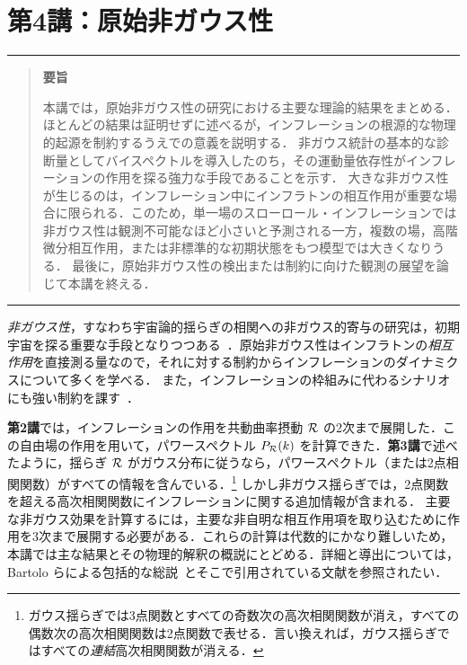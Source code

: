 \part{第4講：原始非ガウス性}

\vspace{0.5cm}
 \hrule \vspace{0.3cm}
\begin{quote}
{\bf 要旨}

\noindent
本講では，原始非ガウス性の研究における主要な理論的結果をまとめる．
ほとんどの結果は証明せずに述べるが，インフレーションの根源的な物理的起源を制約するうえでの意義を説明する．
非ガウス統計の基本的な診断量としてバイスペクトルを導入したのち，その運動量依存性がインフレーションの作用を探る強力な手段であることを示す．
大きな非ガウス性が生じるのは，インフレーション中にインフラトンの相互作用が重要な場合に限られる．このため，単一場のスローロール・インフレーションでは非ガウス性は観測不可能なほど小さいと予測される一方，複数の場，高階微分相互作用，または非標準的な初期状態をもつ模型では大きくなりうる．
最後に，原始非ガウス性の検出または制約に向けた観測の展望を論じて本講を終える．

\end{quote}
\vspace{0.1cm}  \hrule
 \vspace{0.5cm}



{\it 非ガウス性}，すなわち宇宙論的揺らぎの相関への非ガウス的寄与の研究は，初期宇宙を探る重要な手段となりつつある~\cite{Komatsu:2009kd}．原始非ガウス性はインフラトンの{\it 相互作用}を直接測る量なので，それに対する制約からインフレーションのダイナミクスについて多くを学べる．
また，インフレーションの枠組みに代わるシナリオにも強い制約を課す~\cite{Creminelli:2007aq,Koyama_etal07,Buchbinder_etal07, Lehners:2007wc,Lehners:2008my, Koyama:2007ag, Koyama:2007mg}．


{\bf 第2講}では，インフレーションの作用を共動曲率摂動 ${\cal R}$ の2次まで展開した．この自由場の作用を用いて，パワースペクトル $P_{\cal R}(k)$ を計算できた．{\bf 第3講}で述べたように，揺らぎ ${\cal R}$ がガウス分布に従うなら，パワースペクトル（または2点相関関数）がすべての情報を含んでいる．\footnote{ガウス揺らぎでは3点関数とすべての奇数次の高次相関関数が消え，すべての偶数次の高次相関関数は2点関数で表せる．言い換えれば，ガウス揺らぎではすべての{\it 連結}高次相関関数が消える．}
しかし非ガウス揺らぎでは，2点関数を超える高次相関関数にインフレーションに関する追加情報が含まれる．
主要な非ガウス効果を計算するには，主要な非自明な相互作用項を取り込むために作用を3次まで展開する必要がある．これらの計算は代数的にかなり難しいため，本講では主な結果とその物理的解釈の概説にとどめる．詳細と導出については，Bartolo らによる包括的な総説~\cite{NGreview}とそこで引用されている文献を参照されたい．


